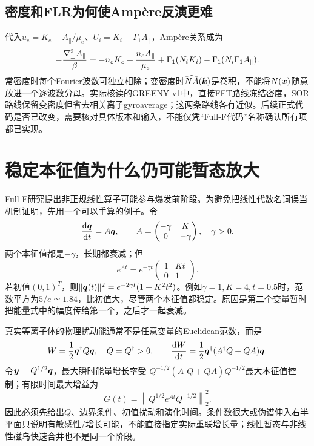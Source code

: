 \subsection{密度和FLR为何使Ampère反演更难}
代入$u_e=K_e-A_\parallel/\mu_e$、$U_i=K_i-\Gamma_1A_\parallel$，Ampère关系成为
\begin{equation}
 -{\nabla_\perp^2 A_\parallel\over\beta}
 =-n_eK_e+{n_eA_\parallel\over\mu_e}
   +\Gamma_1(N_iK_i)-\Gamma_1(N_i\Gamma_1A_\parallel).
\end{equation}
常密度时每个Fourier波数可独立相除；变密度时$\widehat{NA}(\bm{k})$是卷积，不能将$N(\bm{x})$随意放进一个逐波数分母。实际核读的GREENY v1中，直接FFT路线冻结密度，SOR路线保留变密度但省去相关离子gyroaverage；这两条路线各有近似。后续正式代码是否已改变，需要核对具体版本和输入，不能仅凭“Full-F代码”名称确认所有项都已实现\citep{E473}。

\section{稳定本征值为什么仍可能暂态放大}
\label{sec:remaining-nonnormal}
Full-F研究提出非正规线性算子可能参与爆发前阶段\citep{L314}。为避免把线性代数名词误当机制证明，先用一个可以手算的例子。令
\begin{equation}
 {\mathrm d\bm{q}\over\mathrm dt}=A\bm{q},\qquad
 A=\begin{pmatrix}-\gamma&K\\0&-\gamma\end{pmatrix},\quad\gamma>0.
\end{equation}
两个本征值都是$-\gamma$，长期都衰减；但
\begin{equation}
 e^{At}=e^{-\gamma t}\begin{pmatrix}1&Kt\\0&1\end{pmatrix}.
\end{equation}
若初值$(0,1)^T$，则$\|\bm{q}(t)\|^2=e^{-2\gamma t}(1+K^2t^2)$。例如$\gamma=1,K=4,t=0.5$时，范数平方为$5/e\simeq1.84$，比初值大，尽管两个本征值都稳定。原因是第二个变量暂时把能量式中的幅度传给第一个，之后才一起衰减。

真实等离子体的物理扰动能通常不是任意变量的Euclidean范数，而是
\begin{equation}
 W={1\over2}\bm{q}^\dagger Q\bm{q},\quad Q=Q^\dagger>0,
 \qquad {\mathrm dW\over\mathrm dt}={1\over2}\bm{q}^\dagger(A^\dagger Q+QA)\bm{q}.
\end{equation}
令$\bm{y}=Q^{1/2}\bm{q}$，最大瞬时能量增长率受
$Q^{-1/2}(A^\dagger Q+QA)Q^{-1/2}$最大本征值控制；有限时间最大增益为
\begin{equation}
 G(t)=\left\|Q^{1/2}e^{At}Q^{-1/2}\right\|_2^2.
\end{equation}
因此必须先给出$Q$、边界条件、初值扰动和演化时间。条件数很大或伪谱伸入右半平面只说明有敏感性/增长可能，不能直接指定实际重联增长量；线性暂态与非线性磁岛快速合并也不是同一个阶段。

